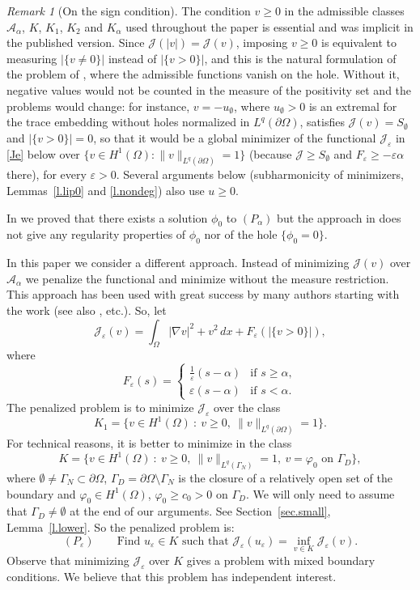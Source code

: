 \documentclass[11pt]{amsart}
\theoremstyle{definition}
\theoremstyle{remark}
\newtheorem{remark}{Remark}[section]
\numberwithin{equation}{section}
\newcommand{\cA}{\mathcal{A}}
\newcommand{\cJ}{\mathcal{J}}
\begin{document}
\begin{remark}[On the sign condition]\label{r.sign}
The condition $v\ge0$ in the admissible classes $\cA_\alpha$, $K$, $K_1$, $K_2$ and $K_\alpha$ used throughout the paper is essential and was implicit in the published version. Since $\cJ(|v|)=\cJ(v)$, imposing $v\ge0$ is equivalent to measuring $|\{v\neq0\}|$ instead of $|\{v>0\}|$, and this is the natural formulation of the problem of \cite{FBRW1}, where the admissible functions vanish on the hole. Without it, negative values would not be counted in the measure of the positivity set and the problems would change: for instance, $v=-u_\emptyset$, where $u_\emptyset>0$ is an extremal for the trace embedding without holes normalized in $L^q(\partial\Omega)$, satisfies $\cJ(v)=S_\emptyset$ and $|\{v>0\}|=0$, so that it would be a global minimizer of the functional $\cJ_\varepsilon$ in \eqref{Je} below over $\{v\in H^1(\Omega):\|v\|_{L^q(\partial\Omega)}=1\}$ (because $\cJ\ge S_\emptyset$ and $F_\varepsilon\ge-\varepsilon\alpha$ there), for every $\varepsilon>0$. Several arguments below (subharmonicity of minimizers, Lemmas~\ref{l.lip0} and \ref{l.nondeg}) also use $u\ge0$.
\end{remark}

In \cite{FBRW1} we proved that there exists a solution $\phi_0$ to $(P_\alpha)$ but the approach in \cite{FBRW1} does not give any regularity properties of $\phi_0$ nor of the hole $\{\phi_0=0\}$.

In this paper we consider a different approach. Instead of minimizing $\cJ(v)$ over $\cA_\alpha$ we penalize the functional and minimize without the measure restriction. This approach has been used with great success by many authors starting with the work \cite{AAC} (see also \cite{ACS,Le1,Le2,Te}, etc.). So, let
\begin{equation}\label{Je}
\cJ_\varepsilon(v)=\int_\Omega|\nabla v|^2+v^2\,dx+F_\varepsilon(|\{v>0\}|),
\end{equation}
where
\[
F_\varepsilon(s)=\begin{cases}\frac1\varepsilon(s-\alpha) & \text{if } s\ge\alpha,\\[2pt] \varepsilon(s-\alpha) & \text{if } s<\alpha.\end{cases}
\]
The penalized problem is to minimize $\cJ_\varepsilon$ over the class
\[
K_1=\{v\in H^1(\Omega)\ :\ v\ge0,\ \|v\|_{L^q(\partial\Omega)}=1\}.
\]
For technical reasons, it is better to minimize in the class
\[
K=\{v\in H^1(\Omega)\ :\ v\ge0,\ \|v\|_{L^q(\Gamma_N)}=1,\ v=\varphi_0\text{ on }\Gamma_D\},
\]
where $\emptyset\neq\Gamma_N\subset\partial\Omega$, $\Gamma_D=\partial\Omega\setminus\Gamma_N$ is the closure of a relatively open set of the boundary and $\varphi_0\in H^1(\Omega)$, $\varphi_0\ge c_0>0$ on $\Gamma_D$. We will only need to assume that $\Gamma_D\neq\emptyset$ at the end of our arguments. See Section~\ref{sec.small}, Lemma~\ref{l.lower}. So the penalized problem is:
\[
(P_\varepsilon)\qquad\text{Find } u_\varepsilon\in K\text{ such that }\cJ_\varepsilon(u_\varepsilon)=\inf_{v\in K}\cJ_\varepsilon(v).
\]
Observe that minimizing $\cJ_\varepsilon$ over $K$ gives a problem with mixed boundary conditions. We believe that this problem has independent interest.
\end{document}
